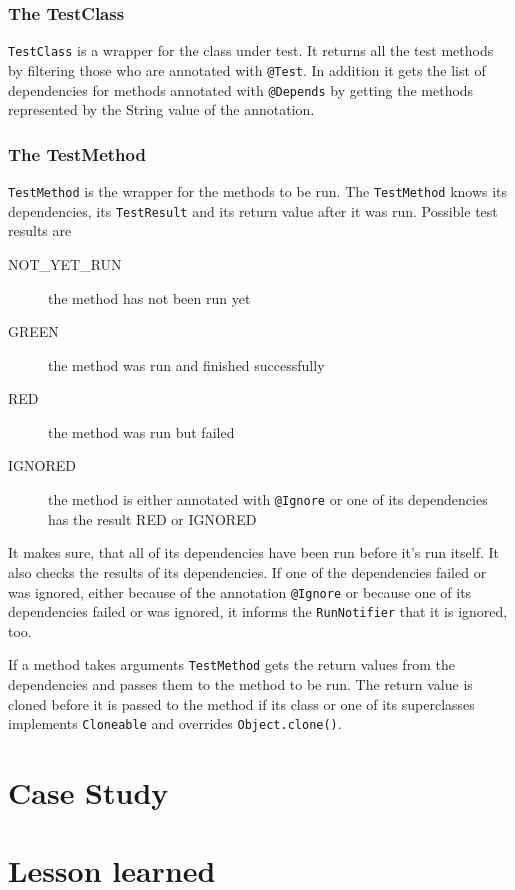 \documentclass[11pt,a4paper,pdftex]{article}
\begin{document}
\subsubsection{The TestClass}

\verb|TestClass| is a wrapper for the class under test. It returns all the test methods by filtering those who are annotated with \verb|@Test|. In addition it gets the list of dependencies for methods annotated with \verb|@Depends| by getting the methods represented by the String value of the annotation.

\subsubsection{The TestMethod}

\verb|TestMethod| is the wrapper for the methods to be run. The \verb|TestMethod| knows its dependencies, its \verb|TestResult| and its return value after it was run. Possible test results are

\begin{description}
 \item[NOT\_YET\_RUN] the method has not been run yet
 \item[GREEN] the method was run and finished successfully
 \item[RED] the method was run but failed
 \item[IGNORED] the method is either annotated with \verb|@Ignore| or one of its dependencies has the result RED or IGNORED
 \end{description}

It makes sure, that all of its dependencies have been run before it's run itself. It also checks the results of its dependencies. If one of the dependencies failed or was ignored, either because of the annotation \verb|@Ignore| or because one of its dependencies failed or was ignored, it informs the \verb|RunNotifier| that it is ignored, too.

If a method takes arguments \verb|TestMethod| gets the return values from the dependencies and passes them to the method to be run. The return value is cloned before it is passed to the method if its class or one of its superclasses implements \verb|Cloneable| and overrides \verb|Object.clone()|.

\section{Case Study}

\section{Lesson learned}
\end{document}
